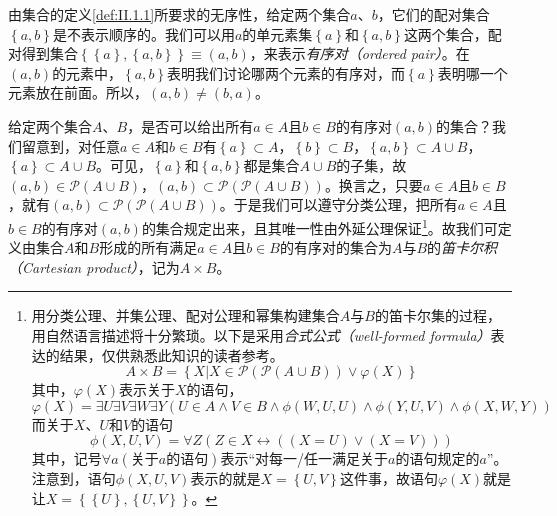 \documentclass[../main.tex]{subfiles}
\begin{document}
由集合的定义\ref{def:II.1.1}所要求的无序性，给定两个集合$a$、$b$，它们的配对集合$\left\{a,b\right\}$是不表示顺序的。我们可以用$a$的单元素集$\left\{a\right\}$和$\left\{a,b\right\}$这两个集合，配对得到集合$\left\{\left\{a\right\},\left\{a,b\right\}\right\}\equiv\left(a,b\right)$，来表示\emph{有序对（ordered pair）}。在$\left(a,b\right)$的元素中，$\left\{a,b\right\}$表明我们讨论哪两个元素的有序对，而$\left\{a\right\}$表明哪一个元素放在前面。所以，$\left(a,b\right)\neq\left(b,a\right)$。

给定两个集合$A$、$B$，是否可以给出所有$a\in A$且$b\in B$的有序对$\left(a,b\right)$的集合？我们留意到，对任意$a\in A$和$b\in B$有$\left\{a\right\}\subset A$，$\left\{b\right\}\subset B$，$\left\{a,b\right\}\subset A\cup B$，$\left\{a\right\}\subset A\cup B$。可见，$\left\{a\right\}$和$\left\{a,b\right\}$都是集合$A\cup B$的子集，故$\left(a,b\right)\in\mathcal{P}\left(A\cup B\right)$，$\left(a,b\right)\subset\mathcal{P}\left(\mathcal{P}\left(A\cup B\right)\right)$。换言之，只要$a\in A$且$b\in B$，就有$\left(a,b\right)\subset\mathcal{P}\left(\mathcal{P}\left(A\cup B\right)\right)$。于是我们可以遵守分类公理，把所有$a\in A$且$b\in B$的有序对$\left(a,b\right)$的集合规定出来，且其唯一性由外延公理保证\footnote{
用分类公理、并集公理、配对公理和幂集构建集合$A$与$B$的笛卡尔集的过程，用自然语言描述将十分繁琐。以下是采用\emph{合式公式（well-formed formula）}表达的结果，仅供熟悉此知识的读者参考。
\[A\times B=\left\{X|X\in\mathcal{P}\left(\mathcal{P}\left(A\cup B\right)\right)\vee\varphi\left(X\right)\right\}
\]
其中，$\varphi\left(X\right)$表示关于$X$的语句，
\[
\varphi\left(X\right)=\exists U\exists V\exists W \exists Y\left(U\in A \wedge V\in B\wedge \phi\left(W,U,U\right)\wedge\phi\left(Y,U,V\right)\wedge\phi\left(X,W,Y\right)\right)
\]
而关于$X$、$U$和$V$的语句
\[
\phi\left(X,U,V\right)=\forall Z\left(Z\in X\leftrightarrow\left(\left(X=U\right)\vee\left(X=V\right)\right)\right)
\]
其中，记号$\forall a\left(\text{关于$a$的语句}\right)$表示“对每一/任一满足关于$a$的语句规定的$a$”。注意到，语句$\phi\left(X,U,V\right)$表示的就是$X=\left\{U,V\right\}$这件事，故语句$\varphi\left(X\right)$就是让$X=\left\{\left\{U\right\},\left\{U,V\right\}\right\}$。
}。故我们可定义由集合$A$和$B$形成的所有满足$a\in A$且$b\in B$的有序对的集合为$A$与$B$的\emph{笛卡尔积（Cartesian product）}，记为$A\times B$。
\end{document}
